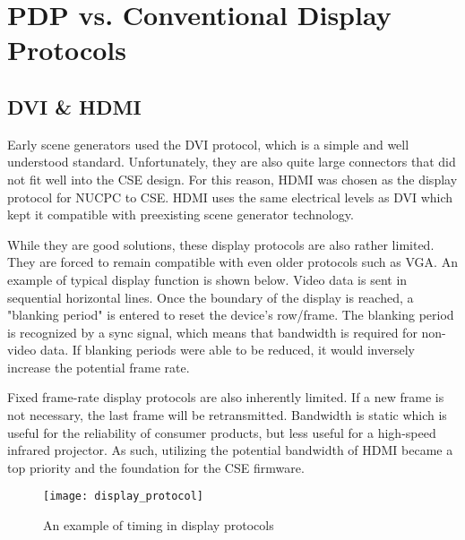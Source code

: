 %
%
\chapter{PDP vs. Conventional Display Protocols}
\section{DVI \& HDMI}
Early scene generators used the DVI protocol, which is a simple and well understood standard. Unfortunately, they are also quite large connectors that did not fit well into the CSE design. For this reason, HDMI was chosen as the display protocol for NUCPC to CSE. HDMI uses the same electrical levels as DVI which kept it compatible with preexisting scene generator technology. \par
While they are good solutions, these display protocols are also rather limited. They are forced to remain compatible with even older protocols such as VGA. An example of typical display function is shown below. Video data is sent in sequential horizontal lines. Once the boundary of the display is reached, a "blanking period" is entered to reset the device's row/frame. The blanking period is recognized by a sync signal, which means that bandwidth is required for non-video data. If blanking periods were able to be reduced, it would inversely increase the potential frame rate. \par
Fixed frame-rate display protocols are also inherently limited. If a new frame is not necessary, the last frame will be retransmitted. Bandwidth is static which is useful for the reliability of consumer products, but less useful for a high-speed infrared projector. As such, utilizing the potential bandwidth of HDMI became a top priority and the foundation for the CSE firmware. 
\begin{figure}[!htb]
\texttt{[image: display\_protocol]}
\centering
\caption{An example of timing in display protocols}
\centering
\end{figure}
